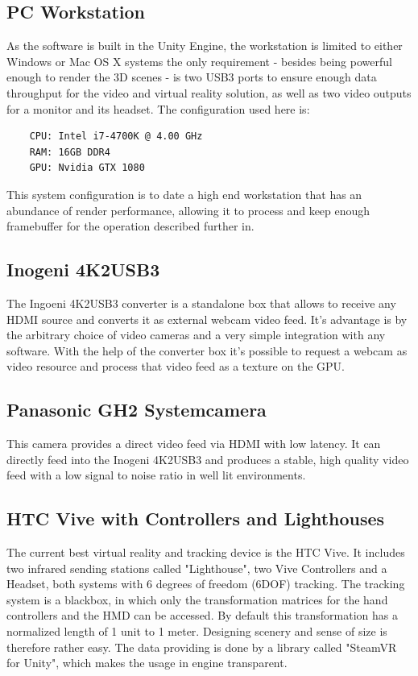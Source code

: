 \subsection{PC Workstation}

As the software is built in the Unity Engine, the workstation is limited to 
either Windows or Mac OS X systems the only requirement - besides being 
powerful enough to render the 3D scenes - is two USB3 ports to ensure enough 
data throughput for the video and virtual reality solution, as well as two 
video outputs for a monitor and its headset.
\newline
The configuration used here is:
\begin{lstlisting}
	CPU: Intel i7-4700K @ 4.00 GHz
	RAM: 16GB DDR4
	GPU: Nvidia GTX 1080
\end{lstlisting}

This system configuration is to date a high end workstation that has an 
abundance of render performance, allowing it to process and keep enough 
framebuffer for the operation described further in.

\subsection{Inogeni 4K2USB3}
The Ingoeni 4K2USB3 converter is a standalone box that allows to receive any 
HDMI source and converts it as external webcam video feed. It's advantage is by 
the arbitrary choice of video cameras and a very simple integration with any 
software. With the help of the converter box it's possible to request a webcam 
as video resource and process that video feed as a texture on the GPU. 

\subsection{Panasonic GH2 Systemcamera}
This camera provides a direct video feed via HDMI with low latency. It can 
directly feed into the Inogeni 4K2USB3 and produces a stable, high quality 
video feed with a low signal to noise ratio in well lit environments.

\subsection{HTC Vive with Controllers and Lighthouses}
The current best virtual reality and tracking device is the HTC Vive. It 
includes two infrared sending stations called "Lighthouse", two Vive 
Controllers and a Headset, both systems with 6 degrees of freedom (6DOF) 
tracking. The tracking system is a blackbox, in which only the transformation 
matrices for the hand controllers and the HMD can be accessed. By default this 
transformation has a normalized length of 1 unit to 1 meter. Designing scenery 
and sense of size is therefore rather easy. The data providing is done by a 
library called "SteamVR for Unity", which makes the usage in engine transparent.

